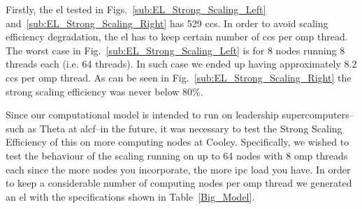 \documentclass[10pt,journal,compsoc]{IEEEtran}
\begin{document}
Firstly, the \gls{el} tested in Figs.~\ref{sub:EL_Strong_Scaling_Left} and~\ref{sub:EL_Strong_Scaling_Right} has 529 \glspl{cc}. In order to avoid scaling efficiency degradation, the \gls{el} has to keep certain number of \glspl{cc} per \gls{omp} thread. The worst case in Fig.~\ref{sub:EL_Strong_Scaling_Left} is for 8 nodes running 8 threads each (i.e. 64 threads). In such case we ended up having approximately 8.2 \glspl{cc} per \gls{omp} thread. As can be seen in Fig.~\ref{sub:EL_Strong_Scaling_Right} the strong scaling efficiency was never below 80\%. 

Since our computational model is intended to run on leadership supercomputers--such as Theta at \gls{alcf}--in the future, it was necessary to test the Strong Scaling Efficiency of this on more computing nodes at Cooley. Specifically, we wished to test the behaviour of the scaling running on up to 64 nodes with 8 \gls{omp} threads each since the more nodes you incorporate, the more \gls{ipc} load you have. In order to keep a considerable number of computing nodes per \gls{omp} thread we generated an \gls{el} with the specifications shown in Table~\ref{Big_Model}. 
\end{document}
